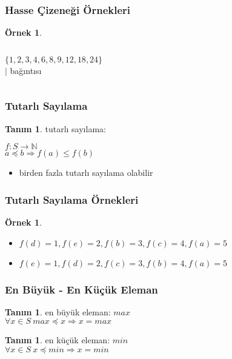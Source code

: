 \documentclass[dvipsnames]{beamer}
\theoremstyle{definition}
\newtheorem{tanim}[theorem]{Tanım}
\theoremstyle{example}
\newtheorem{ornek}[theorem]{Örnek}
\theoremstyle{plain}
\begin{document}
\begin{frame}
  \frametitle{Hasse Çizeneği Örnekleri}

  \begin{ornek}
    \begin{columns}
      $\{1,2,3,4,6,8,9,12,18,24\}$\\
      $|$ bağıntısı

      \begin{center}
      \end{center}
    \end{columns}
  \end{ornek}
\end{frame}

\begin{frame}
  \frametitle{Tutarlı Sayılama}

  \begin{tanim}
    \alert{tutarlı sayılama}:

    $f: S \rightarrow \mathbb{N}$\\
    $a \preceq b \Rightarrow f(a) \leq f(b)$
  \end{tanim}

  \begin{itemize}
    \item birden fazla tutarlı sayılama olabilir
  \end{itemize}
\end{frame}

\begin{frame}
  \frametitle{Tutarlı Sayılama Örnekleri}

  \begin{ornek}
    \begin{center}
    \end{center}

    \begin{itemize}
     \item $f(d)=1, f(e)=2, f(b)=3, f(c)=4, f(a)=5$

     \pause
     \item $f(e)=1, f(d)=2, f(c)=3, f(b)=4, f(a)=5$
    \end{itemize}
  \end{ornek}
\end{frame}

\begin{frame}
  \frametitle{En Büyük - En Küçük Eleman}

  \begin{tanim}
    \alert{en büyük eleman}: $max$\\
    $\forall x \in S~max \preceq x \Rightarrow x = max$
  \end{tanim}

  \pause
  \begin{tanim}
    \alert{en küçük eleman}: $min$\\
    $\forall x \in S~x \preceq min \Rightarrow x = min$
  \end{tanim}
\end{frame}
\end{document}
